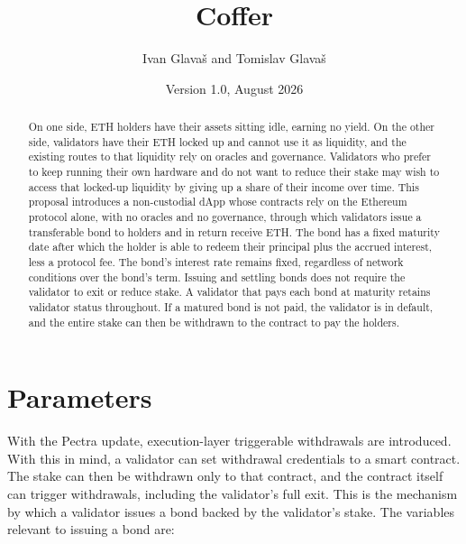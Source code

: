 \documentclass{article}
\title{Coffer}
\author{Ivan Glavaš and Tomislav Glavaš}
\date{Version 1.0, August 2026}
\begin{document}
\maketitle

\begin{abstract}
On one side, ETH holders have their assets sitting idle, earning no yield. On the other side, validators have their ETH locked up and cannot use it as liquidity, and the existing routes to that liquidity rely on oracles and governance. Validators who prefer to keep running their own hardware and do not want to reduce their stake may wish to access that locked-up liquidity by giving up a share of their income over time. This proposal introduces a non-custodial dApp whose contracts rely on the Ethereum protocol alone, with no oracles and no governance, through which validators issue a transferable bond to holders and in return receive ETH. The bond has a fixed maturity date after which the holder is able to redeem their principal plus the accrued interest, less a protocol fee. The bond's interest rate remains fixed, regardless of network conditions over the bond's term. Issuing and settling bonds does not require the validator to exit or reduce stake. A validator that pays each bond at maturity retains validator status throughout. If a matured bond is not paid, the validator is in default, and the entire stake can then be withdrawn to the contract to pay the holders.
\end{abstract}

\section{Parameters}

With the Pectra update, execution-layer triggerable withdrawals are introduced. With this in mind, a validator can set withdrawal credentials to a smart contract. The stake can then be withdrawn only to that contract, and the contract itself can trigger withdrawals, including the validator's full exit. This is the mechanism by which a validator issues a bond backed by the validator's stake. The variables relevant to issuing a bond are:
\end{document}
